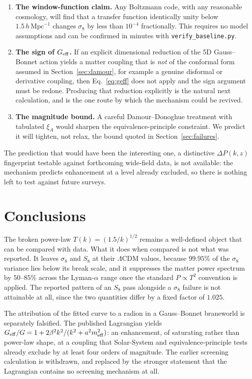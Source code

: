 \documentclass[11pt,a4paper]{article}
\newcommand{\hMpc}{h\,\mathrm{Mpc}^{-1}}
\newcommand{\LCDM}{\Lambda\mathrm{CDM}}
\newcommand{\Geff}{G_{\rm eff}}
\newcommand{\meff}{m_{\rm eff}}
\begin{document}
\begin{enumerate}[leftmargin=1.6em,itemsep=3pt]
\item \textbf{The window-function claim.} Any Boltzmann code, with any reasonable
cosmology, will find that a transfer function identically unity below $1.5\,\hMpc$
changes $\sigma_8$ by less than $10^{-4}$ fractionally. This requires no model
assumptions and can be confirmed in minutes with \texttt{verify\_baseline.py}.
\item \textbf{The sign of $\Geff$.} If an explicit dimensional reduction of the 5D
Gauss--Bonnet action yields a matter coupling that is \emph{not} of the conformal
form assumed in Section~\ref{sec:damour}, for example a genuine disformal or
derivative coupling, then Eq.~\eqref{eq:geff} does not apply and the sign
argument must be redone. Producing that reduction explicitly is the natural
next calculation, and is the one route by which the mechanism could be revived.
\item \textbf{The magnitude bound.} A careful Damour--Donoghue treatment with
tabulated $\xi_A$ would sharpen the equivalence-principle constraint. We predict it
will tighten, not relax, the bound quoted in Section~\ref{sec:failures}.
\end{enumerate}

\noindent
The prediction that would have been the interesting one, a distinctive
$\Delta P(k,z)$ fingerprint testable against forthcoming wide-field data, is not
available: the mechanism predicts enhancement at a level already excluded, so there
is nothing left to test against future surveys.

\section{Conclusions}

The broken power-law $T(k)=(1.5/k)^{1/2}$ remains a well-defined object that can be
compared with data. What it does when compared is not what was reported. It leaves
$\sigma_8$ and $S_8$ at their $\LCDM$ values, because $99.95\%$ of the $\sigma_8$
variance lies below its break scale, and it suppresses the matter power spectrum by
$50$--$85\%$ across the Lyman-$\alpha$ range once the standard $P\propto T^2$
convention is applied. The reported pattern of an $S_8$ pass alongside a $\sigma_8$
failure is not attainable at all, since the two quantities differ by a fixed factor
of $1.025$.

The attribution of the fitted curve to a radion in a Gauss--Bonnet braneworld is
separately falsified. The published Lagrangian yields
$\Geff/G=1+2\beta^2k^2/(k^2+a^2\meff^2)$: an enhancement, of saturating rather than
power-law shape, at a coupling that Solar-System and equivalence-principle tests
already exclude by at least four orders of magnitude. The earlier screening
calculation is withdrawn, and replaced by the stronger statement that the Lagrangian
contains no screening mechanism at all.
\end{document}
